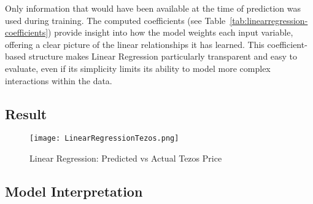  Only information that would have been available at the time of prediction was used during training. 
 The computed coefficients (see Table~\ref{tab:linearregression-coefficients}) provide insight into how the model weights each input variable, offering a clear picture of the linear relationships it has learned. This coefficient-based structure makes Linear Regression particularly transparent and easy to evaluate, even if its simplicity limits its ability to model more complex interactions within the data.

\subsection{Result}
\begin{figure}[H]
    \centering
    \texttt{[image: LinearRegressionTezos.png]}
    \caption{Linear Regression: Predicted vs Actual Tezos Price}
    \label{fig:linearregression-tezos}
\end{figure}

\subsection{Model Interpretation}
\label{sec:linearregression-interpretation}

